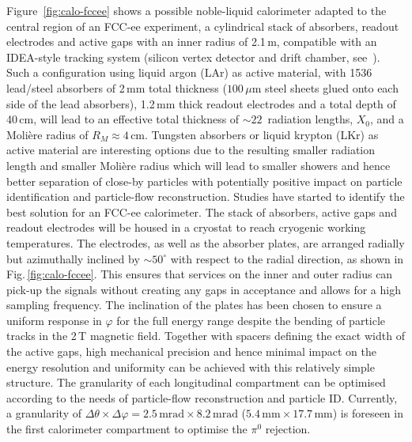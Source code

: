 Figure~\ref{fig:calo-fccee} shows a possible noble-liquid calorimeter adapted to the central region of an FCC-ee experiment, a cylindrical stack of absorbers, readout electrodes and active gaps with an inner radius of 2.1\,m, compatible with an IDEA-style tracking system (silicon vertex detector and drift chamber, see~\cite{Benedikt:2651299}). Such a configuration using liquid argon (LAr) as active material, with 1536 lead/steel absorbers of 2\,mm total thickness ($100\,\mu\mathrm{m}$ steel sheets glued onto each side of the lead absorbers), 1.2\,mm thick readout electrodes and a total depth of 40\,cm, will lead to an effective total thickness of $\sim 22$~radiation lengths, $X_0$, and a Moli\`ere radius of $R_M\approx 4\,\mathrm{cm}$. Tungsten absorbers or liquid krypton (LKr) as active material are interesting options due to the resulting smaller radiation length and smaller Moli\`ere radius which will lead to smaller showers and hence better separation of close-by particles with potentially positive impact on particle identification and particle-flow reconstruction. Studies have started to identify the best solution for an FCC-ee calorimeter. The stack of absorbers, active gaps and readout electrodes will be housed in a cryostat to reach cryogenic working temperatures. 
The electrodes, as well as the absorber plates, are arranged radially but azimuthally inclined by $\sim 50^{\circ}$ with respect to the radial direction, as shown in Fig.\,\ref{fig:calo-fccee}. This ensures that services on the inner and outer radius can pick-up the signals without creating any gaps in acceptance and allows for a high sampling frequency. The inclination of the plates has been chosen to ensure a uniform response in $\varphi$ for the full energy range despite the bending of particle tracks in the 2\,T magnetic field. 
Together with spacers defining the exact width of the active gaps, high mechanical precision and hence minimal impact on the energy resolution and uniformity can be achieved with this relatively simple structure. 
The granularity of each longitudinal compartment can be optimised according to the needs of particle-flow reconstruction and particle ID. Currently, a granularity of $\Delta\theta\times\Delta\varphi = 2.5\,\mathrm{mrad}\times 8.2\,\mathrm{mrad}$ ($5.4\,\mathrm{mm}\times 17.7\,\mathrm{mm}$) is foreseen in the first calorimeter compartment to optimise the $\pi^0$ rejection. 


